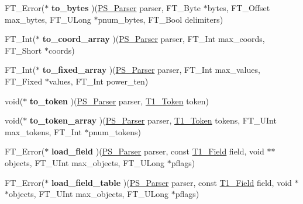 \begin{DoxyCompactItemize}
\item 
\mbox{\label{struct_p_s___parser___funcs_rec___a10c7f67ff642beaa026b19251b4642f6}} 
F\+T\+\_\+\+Error($\ast$ {\bfseries to\+\_\+bytes} )(\hyperlink{struct_p_s___parser_rec__}{P\+S\+\_\+\+Parser} parser, F\+T\+\_\+\+Byte $\ast$bytes, F\+T\+\_\+\+Offset max\+\_\+bytes, F\+T\+\_\+\+U\+Long $\ast$pnum\+\_\+bytes, F\+T\+\_\+\+Bool delimiters)
\item 
\mbox{\label{struct_p_s___parser___funcs_rec___aa2057732838e9a5669f65e5299aff78e}} 
F\+T\+\_\+\+Int($\ast$ {\bfseries to\+\_\+coord\+\_\+array} )(\hyperlink{struct_p_s___parser_rec__}{P\+S\+\_\+\+Parser} parser, F\+T\+\_\+\+Int max\+\_\+coords, F\+T\+\_\+\+Short $\ast$coords)
\item 
\mbox{\label{struct_p_s___parser___funcs_rec___a88946710b0c177f3730c49e43abba7ee}} 
F\+T\+\_\+\+Int($\ast$ {\bfseries to\+\_\+fixed\+\_\+array} )(\hyperlink{struct_p_s___parser_rec__}{P\+S\+\_\+\+Parser} parser, F\+T\+\_\+\+Int max\+\_\+values, F\+T\+\_\+\+Fixed $\ast$values, F\+T\+\_\+\+Int power\+\_\+ten)
\item 
\mbox{\label{struct_p_s___parser___funcs_rec___a03298b95d48251efe9d74d9e1c7bef03}} 
void($\ast$ {\bfseries to\+\_\+token} )(\hyperlink{struct_p_s___parser_rec__}{P\+S\+\_\+\+Parser} parser, \hyperlink{struct_t1___token_rec__}{T1\+\_\+\+Token} token)
\item 
\mbox{\label{struct_p_s___parser___funcs_rec___af2bf35eb7dd33653d97f34c6cf1b47bd}} 
void($\ast$ {\bfseries to\+\_\+token\+\_\+array} )(\hyperlink{struct_p_s___parser_rec__}{P\+S\+\_\+\+Parser} parser, \hyperlink{struct_t1___token_rec__}{T1\+\_\+\+Token} tokens, F\+T\+\_\+\+U\+Int max\+\_\+tokens, F\+T\+\_\+\+Int $\ast$pnum\+\_\+tokens)
\item 
\mbox{\label{struct_p_s___parser___funcs_rec___a33c37608a63a065ee93fd346a44f0404}} 
F\+T\+\_\+\+Error($\ast$ {\bfseries load\+\_\+field} )(\hyperlink{struct_p_s___parser_rec__}{P\+S\+\_\+\+Parser} parser, const \hyperlink{struct_t1___field_rec__}{T1\+\_\+\+Field} field, void $\ast$$\ast$objects, F\+T\+\_\+\+U\+Int max\+\_\+objects, F\+T\+\_\+\+U\+Long $\ast$pflags)
\item 
\mbox{\label{struct_p_s___parser___funcs_rec___a0952dd98193c4f73fe0a1281188ad395}} 
F\+T\+\_\+\+Error($\ast$ {\bfseries load\+\_\+field\+\_\+table} )(\hyperlink{struct_p_s___parser_rec__}{P\+S\+\_\+\+Parser} parser, const \hyperlink{struct_t1___field_rec__}{T1\+\_\+\+Field} field, void $\ast$$\ast$objects, F\+T\+\_\+\+U\+Int max\+\_\+objects, F\+T\+\_\+\+U\+Long $\ast$pflags)
\end{DoxyCompactItemize}


